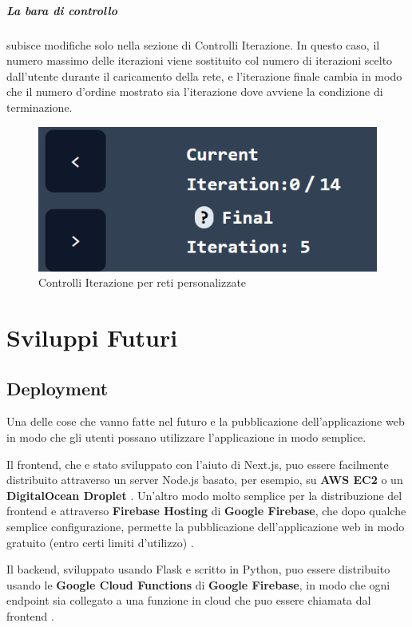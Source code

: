 \documentclass[a4paper,12pt]{report}
\begin{document}
			\paragraph*{La bara di controllo} subisce modifiche solo nella sezione di Controlli Iterazione. In questo caso, il numero massimo delle iterazioni viene sostituito col numero di iterazioni scelto dall'utente durante il caricamento della rete, e l'iterazione finale cambia in modo che il numero d'ordine mostrato sia l'iterazione dove avviene la condizione di terminazione.

			\begin{center}
				\begin{figure}[H]
				\centering
				\includegraphics[width=0.5\linewidth]{iterationcontrolcustom}
				\caption{Controlli Iterazione per reti personalizzate}
				\end{figure}
			\end{center}
\chapter{Sviluppi Futuri}

	\section{Deployment}

	Una delle cose che vanno fatte nel futuro e la pubblicazione dell'applicazione web in modo che gli utenti possano utilizzare l'applicazione in modo semplice.

	Il frontend, che e stato sviluppato con l'aiuto di Next.js, puo essere facilmente distribuito attraverso un server Node.js basato, per esempio, su \textbf{AWS EC2} o un \textbf{DigitalOcean Droplet} \cite{nextjsdep}. Un'altro modo molto semplice per la distribuzione del frontend e attraverso \textbf{Firebase Hosting} di \textbf{Google Firebase}, che dopo qualche semplice configurazione, permette la pubblicazione dell'applicazione web in modo gratuito (entro certi limiti d'utilizzo) \cite{firebasehosting}. 

	Il backend, sviluppato usando Flask e scritto in Python, puo essere distribuito usando le \textbf{Google Cloud Functions} di \textbf{Google Firebase}, in modo che ogni endpoint sia collegato a una funzione in cloud che puo essere chiamata dal frontend \cite{googlecloudfunctions}.
\end{document}
